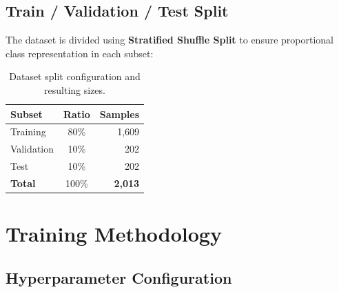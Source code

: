 \documentclass[12pt, a4paper]{article}
\begin{document}
\subsection{Train / Validation / Test Split}

The dataset is divided using \textbf{Stratified Shuffle Split} to ensure proportional class representation in each subset:

\begin{table}[H]
    \centering
    \caption{Dataset split configuration and resulting sizes.}
    \label{tab:split}
    \begin{tabular}{lcr}
        \toprule
        \textbf{Subset} & \textbf{Ratio} & \textbf{Samples} \\
        \midrule
        Training   & 80\% & 1{,}609 \\
        Validation & 10\% & 202 \\
        Test       & 10\% & 202 \\
        \midrule
        \textbf{Total} & 100\% & \textbf{2{,}013} \\
        \bottomrule
    \end{tabular}
\end{table}

\section{Training Methodology}
\label{sec:training}

\subsection{Hyperparameter Configuration}
\end{document}
